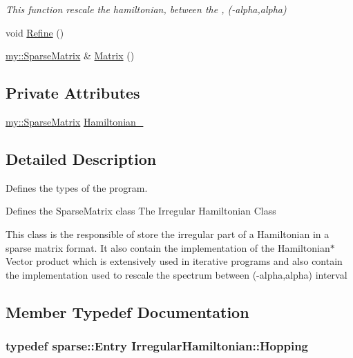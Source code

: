 \begin{DoxyCompactItemize}
\begin{DoxyCompactList}\small\item\em This function rescale the hamiltonian, between the , (-\/alpha,alpha) \end{DoxyCompactList}\item 
void \hyperlink{classIrregularHamiltonian_a363880d9a79e5b120a5988c00b40c6dc}{Refine} ()
\item 
\hyperlink{classmy_1_1SparseMatrix}{my\+::\+Sparse\+Matrix} \& \hyperlink{classIrregularHamiltonian_a848ab690df366e151cd84a66111299dd}{Matrix} ()
\end{DoxyCompactItemize}
\subsection*{Private Attributes}
\begin{DoxyCompactItemize}
\item 
\hyperlink{classmy_1_1SparseMatrix}{my\+::\+Sparse\+Matrix} \hyperlink{classIrregularHamiltonian_ab8a68c2c78e2a7e7b308b17bb2977fc4}{Hamiltonian\+\_\+}
\end{DoxyCompactItemize}


\subsection{Detailed Description}
Defines the types of the program. 

Defines the Sparse\+Matrix class The Irregular Hamiltonian Class

This class is the responsible of store the irregular part of a Hamiltonian in a sparse matrix format. It also contain the implementation of the Hamiltonian$\ast$\+Vector product which is extensively used in iterative programs and also contain the implementation used to rescale the spectrum between (-\/alpha,alpha) interval 

\subsection{Member Typedef Documentation}
\hypertarget{classIrregularHamiltonian_ac7037c4beb0bd21bfa728132c3235b61}{
\subsubsection[{Hopping}]{\setlength{\rightskip}{0pt plus 5cm}typedef {\bf sparse\+::\+Entry} {\bf Irregular\+Hamiltonian\+::\+Hopping}}}\label{classIrregularHamiltonian_ac7037c4beb0bd21bfa728132c3235b61}


